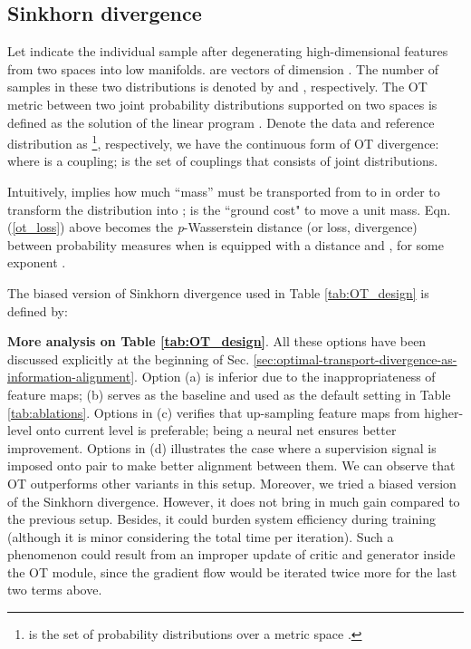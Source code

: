 \documentclass{article} \usepackage{iclr2019_conference,times}
\begin{document}
\subsection{Sinkhorn divergence}\label{sec:sinkhorn-divergence}

Let  indicate the individual sample after degenerating high-dimensional features  from two spaces into low manifolds.
 are vectors of dimension . The number of samples in these two distributions is denoted by  and , respectively.
The OT metric between two joint probability distributions supported
on two  spaces  is defined as the solution of the linear program \citep{cuturi2013_regularized_OT}. Denote the data and reference distribution as
\footnote{ is the set of probability distributions over a metric space .}, respectively, we have the continuous form of OT divergence: 
where  is a coupling;  is the set of couplings that consists of joint distributions.

Intuitively,  implies how much ``mass'' must be transported from  to  in order to transform the distribution  into  ;  is the ``ground cost" to move a unit mass. Eqn. (\ref{ot_loss}) above becomes the \textit{p}-Wasserstein distance (or loss, divergence) between probability measures when  is equipped with a distance  and , for some exponent .



The biased version of Sinkhorn divergence used in Table \ref{tab:OT_design} is defined by:
 


\textbf{More analysis on Table \ref{tab:OT_design}}.
All these options have been discussed explicitly at the beginning of Sec. \ref{sec:optimal-transport-divergence-as-information-alignment}.
Option (a) is inferior due to the inappropriateness of feature maps; (b) serves as the baseline and used as the default setting in Table \ref{tab:ablations}.
Options in (c) verifies that up-sampling feature maps from higher-level onto current level is preferable;  being a neural net ensures better improvement.
Options in (d) illustrates the case where a supervision signal is imposed onto pair  to make better alignment between them.
We can observe that OT outperforms other variants in this setup. Moreover, we tried a biased version \citep{genevay2017_sinkhorn_loss} of the Sinkhorn divergence.
However, it does not bring in much gain compared to the previous setup. Besides, it could burden system efficiency during training (although it is minor considering the total time per iteration). Such a phenomenon could result from an improper update of critic and generator inside the OT module, since the gradient flow would be iterated twice more for the last two terms above.
\end{document}
